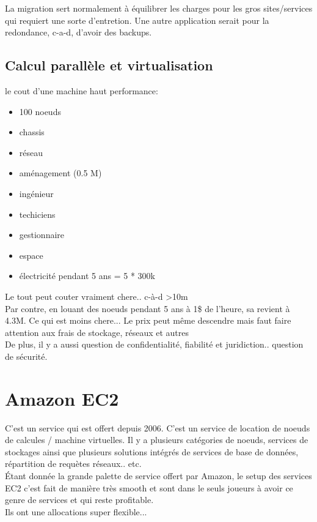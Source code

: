 \documentclass[oneside]{book}
\begin{document}
La migration sert normalement à équilibrer les charges pour les gros sites/services qui requiert une sorte d'entretion. Une autre application serait pour la redondance, c-a-d, d'avoir des backups. 
\subsection{Calcul parallèle et virtualisation}
le cout d'une machine haut performance:
\begin{itemize}
\item 100 noeuds
\item chassis
\item réseau
\item aménagement (0.5 M)
\item ingénieur
\item techiciens
\item gestionnaire
\item espace
\item électricité pendant 5 ans = 5 * 300k
\end{itemize}
Le tout peut couter vraiment chere.. c-à-d >10m\\

Par contre, en louant des noeuds pendant 5 ans à 1\$ de l'heure, sa revient à 4.3M. Ce qui est moins chere... Le prix peut même descendre mais faut faire attention aux frais de stockage, réseaux et autres\\

De plus, il y a aussi question de confidentialité, fiabilité et juridiction.. question de sécurité.

\section{Amazon EC2}
C'est un service qui est offert depuis 2006. C'est un service de location de noeuds de calcules / machine virtuelles. Il y a plusieurs catégories de noeuds, services de stockages ainsi que plusieurs solutions intégrés de services de base de données, répartition de requètes réseaux.. etc.\\

Étant donnée la grande palette de service offert par Amazon, le setup des services EC2 c'est fait de manière très smooth et sont dans le seuls joueurs à avoir ce genre de services et qui reste profitable.\\

Ils ont une allocations super flexible...\\
\end{document}
